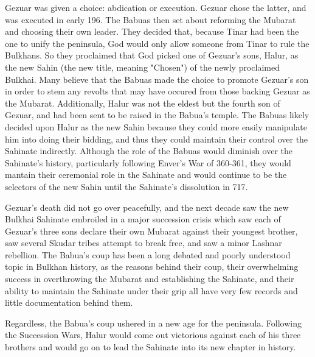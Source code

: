 Gezuar was given a choice: abdication or execution. Gezuar chose the latter, and was executed in early 196. The Babuas then set about reforming the Mubarat and choosing their own leader. They decided that, because Tinar had been the one to unify the peninsula, God would only allow someone from Tinar to rule the Bulkhans. So they proclaimed that God picked one of Gezuar's sons, Halur, as the new Sahin (the new title, meaning "Chosen") of the newly proclaimed Bulkhai. Many believe that the Babuas made the choice to promote Gezuar's son in order to stem any revolts that may have occured from those backing Gezuar as the Mubarat. Additionally, Halur was not the eldest but the fourth son of Gezuar, and had been sent to be raised in the Babua's temple. The Babuas likely decided upon Halur as the new Sahin because they could more easily manipulate him into doing their bidding, and thus they could maintain their control over the Sahinate indirectly. Although the role of the Babuas would diminish over the Sahinate's history, particularly following Enver's War of 360-361, they would mantain their ceremonial role in the Sahinate and would continue to be the selectors of the new Sahin until the Sahinate's dissolution in 717.

Gezuar's death did not go over peacefully, and the next decade saw the new Bulkhai Sahinate embroiled in a major succession crisis which saw each of Gezuar's three sons declare their own Mubarat against their youngest brother, saw several Skudar tribes attempt to break free, and saw a minor Lashnar rebellion. The Babua's coup has been a long debated and poorly understood topic in Bulkhan history, as the reasons behind their coup, their overwhelming success in overthrowing the Mubarat and establishing the Sahinate, and their ability to maintain the Sahinate under their grip all have very few records and little documentation behind them.

Regardless, the Babua's coup ushered in a new age for the peninsula. Following the Succession Wars, Halur would come out victorious against each of his three brothers and would go on to lead the Sahinate into its new chapter in history.
